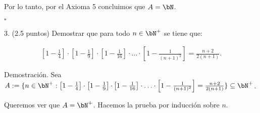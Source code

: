 \documentclass[letterpaper,11pt]{article}
\begin{document}
  Por lo tanto, por el Axioma 5 concluimos que $A = \bN$.

  \begin{flushright}
    $\square$
  \end{flushright}

  3. (2.5 puntos) Demostrar que para todo $n \in \bN^+$ se tiene que:

  \begin{align*}
    \left [1 - \frac{1}{4} \right] \cdot \left [1 - \frac{1}{9} \right] \cdotp \left [1 - \frac{1}{16} \right] \cdot \dotsc \cdot \left [1 - \frac{1}{(n+1)^2} \right] = \frac{n + 2}{2(n + 1)}.
  \end{align*}

  Demostración. Sea $A := \{ n \in \bN^+ : \left [1 - \frac{1}{4} \right] \cdot \left [1 - \frac{1}{9} \right] \cdotp \left [1 - \frac{1}{16} \right] \cdot \dotsc \cdot \left [1 - \frac{1}{(n+1)^2} \right] = \frac{n + 2}{2(n + 1)} \} \subseteq \bN^+$.

  Queremos ver que $A = \bN^+$. Hacemos la prueba por inducción sobre $n$.
\end{document}
